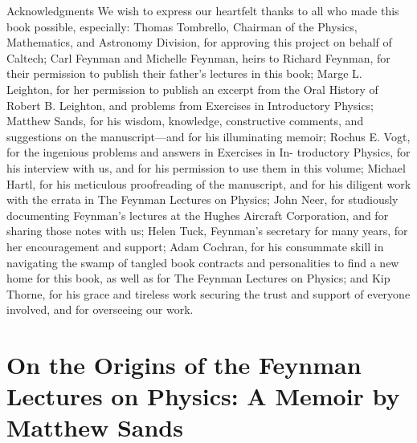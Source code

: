 \documentclass[11pt,oneside]{article}
\begin{document}
Acknowledgments We wish to express our heartfelt thanks to all who made this book possible, especially: Thomas Tombrello, Chairman of the Physics, Mathematics, and Astronomy Division, for approving this project on behalf of Caltech; Carl Feynman and Michelle Feynman, heirs to Richard Feynman, for their permission to publish their father’s lectures in this book; Marge L. Leighton, for her permission to publish an excerpt from the Oral History of Robert B. Leighton, and problems from Exercises in Introductory Physics; Matthew Sands, for his wisdom, knowledge, constructive comments, and suggestions on the manuscript---and for his illuminating memoir; Rochus E. Vogt, for the ingenious problems and answers in Exercises in In- troductory Physics, for his interview with us, and for his permission to use them in this volume; Michael Hartl, for his meticulous proofreading of the manuscript, and for his diligent work with the errata in The Feynman Lectures on Physics; John Neer, for studiously documenting Feynman’s lectures at the Hughes Aircraft Corporation, and for sharing those notes with us; Helen Tuck, Feynman’s secretary for many years, for her encouragement and support; Adam Cochran, for his consummate skill in navigating the swamp of tangled book contracts and personalities to find a new home for this book, as well as for The Feynman Lectures on Physics; and Kip Thorne, for his grace and tireless work securing the trust and support of everyone involved, and for overseeing our work.\par



\clearpage


\section*{On the Origins of the Feynman Lectures on Physics: A Memoir by Matthew Sands}



\label{tips-sec-5-on-the-origins-of-the-feynman-lectures-on-physics-a-memoir-by-matthew-sands}

\end{document}
